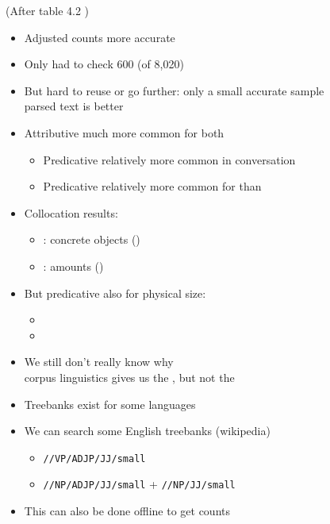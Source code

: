 \documentclass[a4paper,landscape,headrule,footrule,xetex]{foils}
\begin{document}
(After table 4.2 \citep[p 93]{Biber:Conrad:Reppen:1998})

\begin{itemize}
\item Adjusted counts more accurate
\item Only had to check 600 (of 8,020)
\item But hard to reuse or go further: only a small accurate sample
  \\ parsed text is better
\end{itemize}


\begin{itemize}
\item Attributive much more common for both
  \begin{itemize}
  \item Predicative relatively more common in conversation
  \item Predicative relatively more common for  than 
  \end{itemize}
\item Collocation results:
  \begin{itemize}
  \item {}: concrete objects ()
  \item {}: amounts  ()
  \end{itemize}
\item But predicative  also for physical size:
  \begin{itemize}
  \item {}
  \item {}
  \end{itemize}
\item We still don't really know why \frownie
 \\ corpus linguistics gives us the , but not the 
\end{itemize}


\begin{itemize}
\item Treebanks exist for some languages
\item We can search some English treebanks (wikipedia)
\\ 
\begin{itemize}
\item  \verb|//VP/ADJP/JJ/small| 
\item \verb|//NP/ADJP/JJ/small| + \verb|//NP/JJ/small| 
\end{itemize}
\item This can also be done offline to get counts
\end{itemize}
\end{document}
